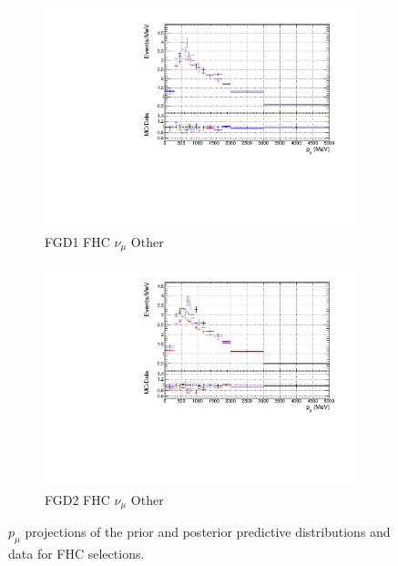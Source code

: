 \begin{figure}
\begin{subfigure}{0.49\textwidth}
  \centering
  \includegraphics[width=\textwidth]{figs/priorpred1D_p_FGD1_numuCC_other}
  \caption{FGD1 FHC $\nu_{\mu}$ Other}
\end{subfigure}
\begin{subfigure}{0.49\textwidth}
  \centering
  \includegraphics[width=\textwidth]{figs/priorpred1D_p_FGD2_numuCC_other}
  \caption{FGD2 FHC $\nu_{\mu}$ Other}
\end{subfigure}
\caption{$p_{\mu}$ projections of the prior and posterior predictive distributions and data for FHC \numu selections.}
\label{fig:priorpost_fhc_p}
\end{figure}

